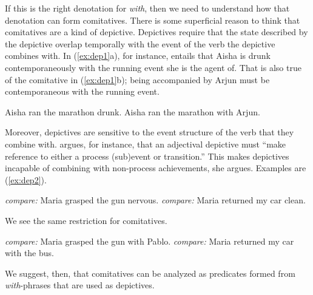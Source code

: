\documentclass[twoside, 12pt]{article}
\begin{document}
If this is the right denotation for \textit{with}, then we need to understand how that denotation can form comitatives. There is some superficial reason to think that comitatives are a kind of depictive. Depictives require that the state described by the depictive overlap temporally with the event of the verb the depictive combines with. In (\ref{ex:dep1}a), for instance, entails that Aisha is drunk contemporaneously with the running event she is the agent of. That is also true of the comitative in (\ref{ex:dep1}b); being accompanied by Arjun must be contemporaneous with the running event.
\begin{exe}
\raggedright
  \ex \label{ex:dep1} 
  \begin{xlist}
    \ex Aisha ran the marathon drunk.
    \ex Aisha ran the marathon with Arjun.
  \end{xlist}
\end{exe}
Moreover, depictives are sensitive to the event structure of the verb that they combine with. \citet[(6):~11]{Ardid-Gumiel:2001} argues, for instance, that an adjectival depictive must ``make reference to either a process (sub)event or transition.'' This makes depictives incapable of combining with non-process achievements, she argues. Examples are (\ref{ex:dep2}).
\begin{exe}
\raggedright
  \ex \label{ex:dep2}
  \begin{xlist}
    \sn \textit{compare:} Maria grasped the gun nervous.
    \sn \textit{compare:} Maria returned my car clean.
  \end{xlist}
  \hfill \citep[based on (7)-(8):~5]{Ardid-Gumiel:2001}\hfill\hspace*{.15in}
\end{exe}
We see the same restriction for comitatives.
\begin{exe}
\raggedright
  \ex \label{ex:com1}
  \begin{xlist}
    \sn \textit{compare:} Maria grasped the gun with Pablo.
    \sn \textit{compare:} Maria returned my car with the bus.
  \end{xlist}
\end{exe}
We suggest, then, that comitatives can be analyzed as predicates formed from \textit{with}-phrases that are used as depictives.
\end{document}
